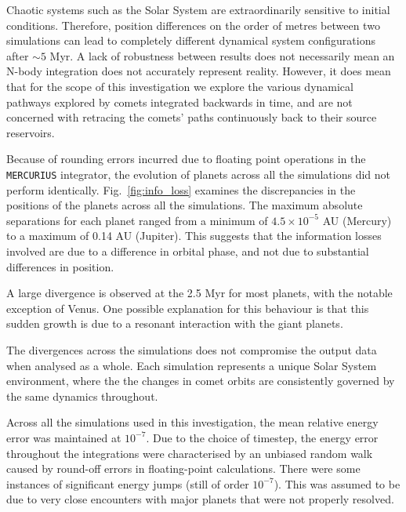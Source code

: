 Chaotic systems such as the Solar System are extraordinarily sensitive to initial conditions. Therefore, position differences on the order of metres between two simulations can lead to completely different dynamical system configurations after $\sim5$ Myr. A lack of robustness between results does not necessarily mean an N-body integration does not accurately represent reality. However, it does mean that for the scope of this investigation we explore the various dynamical pathways explored by comets integrated backwards in time, and are not concerned with retracing the comets' paths continuously back to their source reservoirs.

Because of rounding errors incurred due to floating point operations in the \texttt{MERCURIUS} integrator, the evolution of planets across all the simulations did not perform identically. Fig.~\ref{fig:info_loss} examines the discrepancies in the positions of the planets across all the simulations. The maximum absolute separations for each planet ranged from a minimum of $4.5\times10^{-5}$ AU (Mercury) to a maximum of 0.14 AU (Jupiter). This suggests that the information losses involved are due to a difference in orbital phase, and not due to substantial differences in position.

A large divergence is observed at the 2.5 Myr for most planets, with the notable exception of Venus. One possible explanation for this behaviour is that this sudden growth is due to a resonant interaction with the giant planets.

The divergences across the simulations does not compromise the output data when analysed as a whole. Each simulation represents a unique Solar System environment, where the the changes in comet orbits are consistently governed by the same dynamics throughout. 

Across all the simulations used in this investigation, the mean relative energy error was maintained at $10^{-7}$. Due to the choice of timestep, the energy error throughout the integrations were characterised by an unbiased random walk caused by round-off errors in floating-point calculations. There were some instances of significant energy jumps (still of order $10^{-7}$). This was assumed to be due to very close encounters with major planets that were not properly resolved.

\iffalse
\begin{figure}[t!]
    \centering
    \texttt{[image: error.pdf]}
    \caption[]{}
    \label{fig:error}
\end{figure}
\fi

